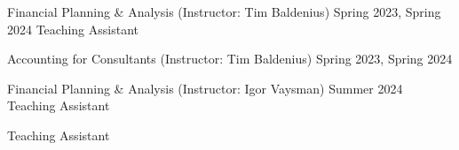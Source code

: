 

\begin{cventries}

\cventrysimple
    {Financial Planning \& Analysis (Instructor: Tim Baldenius)}  %
    {Spring 2023, Spring 2024} %
    {Teaching Assistant}
	
\cventrysimple
	{Accounting for Consultants (Instructor: Tim Baldenius)}  %
    {Spring 2023, Spring 2024} %

\cventrysimple
    {Financial Planning \& Analysis (Instructor: Igor Vaysman)}  %
    {Summer 2024} %
    {Teaching Assistant}
	
{Teaching Assistant}


\end{cventries}
